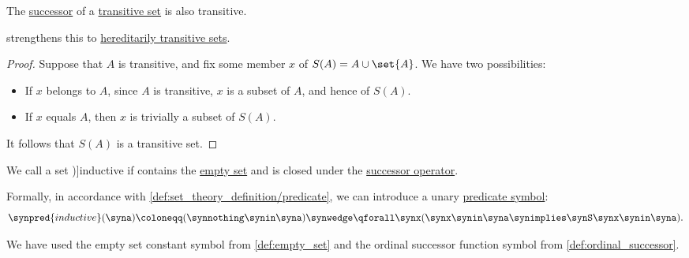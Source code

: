 \begin{proposition}\label{thm:successor_of_transitive_set}
  The \hyperref[def:ordinal_successor]{successor} of a \hyperref[def:transitive_set]{transitive set} is also transitive.
\end{proposition}
\begin{comments}
  \item {} strengthens this to \hyperref[def:hereditarily_transitive_set]{hereditarily transitive sets}.
\end{comments}
\begin{proof}
  Suppose that \( A \) is transitive, and fix some member \( x \) of \( S(A) = A \cup \set{ A } \). We have two possibilities:
  \begin{itemize}
    \item If \( x \) belongs to \( A \), since \( A \) is transitive, \( x \) is a subset of \( A \), and hence of \( S(A) \).
    \item If \( x \) equals \( A \), then \( x \) is trivially a subset of \( S(A) \).
  \end{itemize}

  It follows that \( S(A) \) is a transitive set.
\end{proof}

\begin{definition}\label{def:inductive_set}
  We call a set \term[ru=индуктивное (множество) (\cite[184]{Герасимов2014Вычислимость})]{inductive} if contains the \hyperref[def:empty_set]{empty set} and is closed under the \hyperref[def:ordinal_successor]{successor operator}.

  Formally, in accordance with \cref{def:set_theory_definition/predicate}, we can introduce a unary \hyperref[def:fol_signature/predicate]{predicate symbol}:
  \begin{equation*}
    \synpred{inductive}(\syna) \coloneqq (\synnothing \synin \syna) \synwedge \qforall \synx (\synx \synin \syna \synimplies \synS \synx \synin \syna).
  \end{equation*}

  We have used the empty set constant symbol from \cref{def:empty_set} and the ordinal successor function symbol from \cref{def:ordinal_successor}.
\end{definition}

